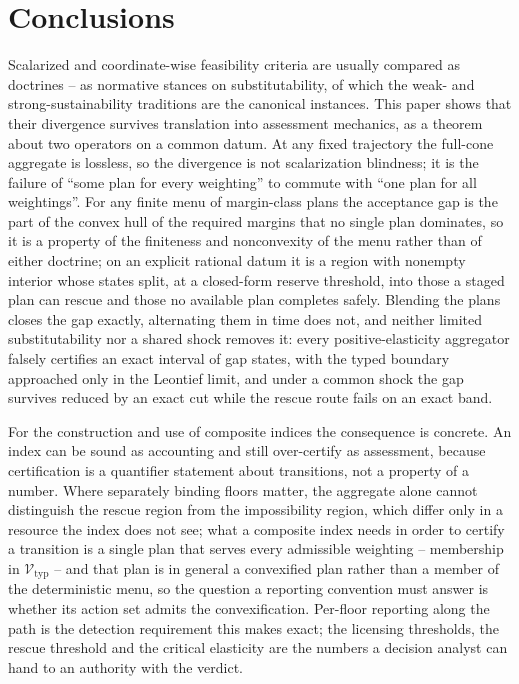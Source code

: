 \documentclass[preprint,11pt,authoryear]{elsarticle}
\theoremstyle{definition}
\theoremstyle{remark}
\newcommand{\Vtyp}{\mathcal{V}_{\mathrm{typ}}}
\begin{document}
\section{Conclusions}\label{sec:conclusions}

Scalarized and coordinate-wise feasibility criteria are usually compared as doctrines -- as normative stances on substitutability, of which the weak- and strong-sustainability traditions are the canonical instances. This paper shows that their divergence survives translation into assessment mechanics, as a theorem about two operators on a common datum. At any fixed trajectory the full-cone aggregate is lossless, so the divergence is not scalarization blindness; it is the failure of ``some plan for every weighting'' to commute with ``one plan for all weightings''. For any finite menu of margin-class plans the acceptance gap is the part of the convex hull of the required margins that no single plan dominates, so it is a property of the finiteness and nonconvexity of the menu rather than of either doctrine; on an explicit rational datum it is a region with nonempty interior whose states split, at a closed-form reserve threshold, into those a staged plan can rescue and those no available plan completes safely. Blending the plans closes the gap exactly, alternating them in time does not, and neither limited substitutability nor a shared shock removes it: every positive-elasticity aggregator falsely certifies an exact interval of gap states, with the typed boundary approached only in the Leontief limit, and under a common shock the gap survives reduced by an exact cut while the rescue route fails on an exact band.

For the construction and use of composite indices the consequence is concrete. An index can be sound as accounting and still over-certify as assessment, because certification is a quantifier statement about transitions, not a property of a number. Where separately binding floors matter, the aggregate alone cannot distinguish the rescue region from the impossibility region, which differ only in a resource the index does not see; what a composite index needs in order to certify a transition is a single plan that serves every admissible weighting -- membership in $\Vtyp$ -- and that plan is in general a convexified plan rather than a member of the deterministic menu, so the question a reporting convention must answer is whether its action set admits the convexification. Per-floor reporting along the path is the detection requirement this makes exact; the licensing thresholds, the rescue threshold and the critical elasticity are the numbers a decision analyst can hand to an authority with the verdict.
\end{document}
